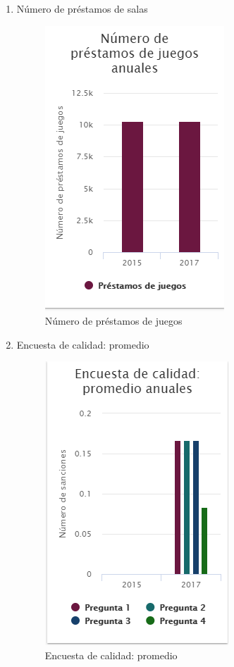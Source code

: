 \begin{itemize}
\begin{enumerate}
	\item Número de préstamos de salas
	\begin{figure}[hbtp]
	\includegraphics[scale=0.7]{images/InterfazMovil/IUGS15_juegosAnos.PNG}
	\caption{Número de préstamos de juegos}
	\end{figure}
	
	\item Encuesta de calidad: promedio
	\begin{figure}[hbtp]
	\includegraphics[scale=0.7]{images/InterfazMovil/IUGS15_encuestaCalidadAnos.PNG}
	\caption{Encuesta de calidad: promedio}
	\end{figure}
	

\end{enumerate}
\end{itemize}
